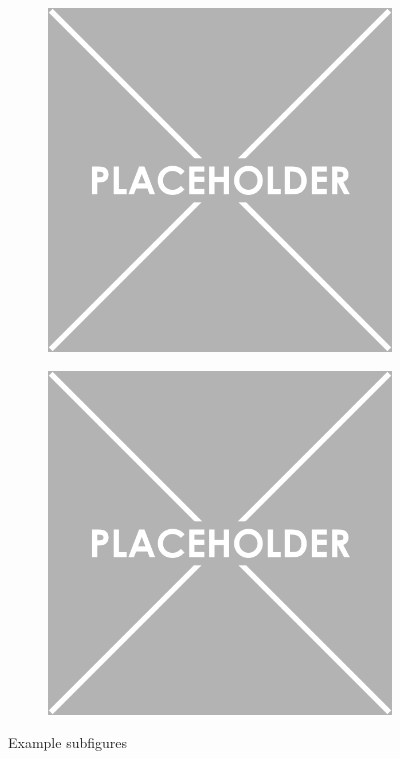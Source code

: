 \documentclass{article}
\begin{document}
\begin{figure}[H]
\begin{subfigure}[b]{0.5\textwidth}
			\end{subfigure}
			\vfill
			\begin{subfigure}[b]{0.5\textwidth}
				\centering
				\includegraphics[width=\textwidth]{Figures/Example}
			\end{subfigure}
			\hfill
			\begin{subfigure}[b]{0.5\textwidth}
				\centering
				\includegraphics[width=\textwidth]{Figures/Example}
			\end{subfigure}
			\caption{Example subfigures}
			\label{subfig}
		\end{figure}
\end{document}
